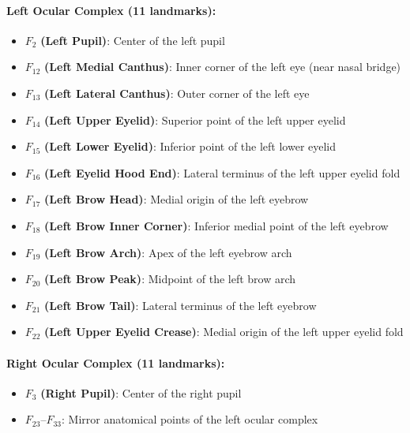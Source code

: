 \paragraph{Left Ocular Complex (11 landmarks):}
\begin{itemize}
    \item $F_2$ \textbf{(Left Pupil)}: Center of the left pupil
    \item $F_{12}$ \textbf{(Left Medial Canthus)}: Inner corner of the left eye (near nasal bridge)
    \item $F_{13}$ \textbf{(Left Lateral Canthus)}: Outer corner of the left eye
    \item $F_{14}$ \textbf{(Left Upper Eyelid)}: Superior point of the left upper eyelid
    \item $F_{15}$ \textbf{(Left Lower Eyelid)}: Inferior point of the left lower eyelid
    \item $F_{16}$ \textbf{(Left Eyelid Hood End)}: Lateral terminus of the left upper eyelid fold
    \item $F_{17}$ \textbf{(Left Brow Head)}: Medial origin of the left eyebrow
    \item $F_{18}$ \textbf{(Left Brow Inner Corner)}: Inferior medial point of the left eyebrow
    \item $F_{19}$ \textbf{(Left Brow Arch)}: Apex of the left eyebrow arch
    \item $F_{20}$ \textbf{(Left Brow Peak)}: Midpoint of the left brow arch
    \item $F_{21}$ \textbf{(Left Brow Tail)}: Lateral terminus of the left eyebrow
    \item $F_{22}$ \textbf{(Left Upper Eyelid Crease)}: Medial origin of the left upper eyelid fold
\end{itemize}

\paragraph{Right Ocular Complex (11 landmarks):}
\begin{itemize}
    \item $F_3$ \textbf{(Right Pupil)}: Center of the right pupil
    \item $F_{23}$--$F_{33}$: Mirror anatomical points of the left ocular complex
\end{itemize}

